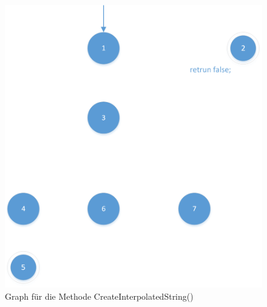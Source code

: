 \begin{figure}[]
	\centering
	\includegraphics[width=\textwidth]{images/GraphCreateInterpolatedString.png}
	\caption{Graph für die Methode CreateInterpolatedString()}
	\label{fig:graph-interpolatedstring}
\end{figure}